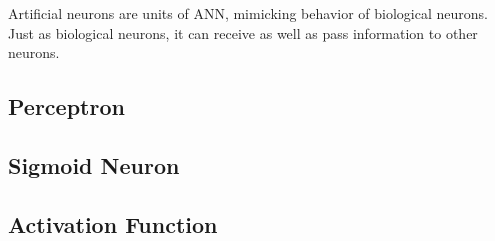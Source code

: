 Artificial neurons are units of ANN, mimicking behavior of biological neurons. Just as biological neurons, it can receive as well as pass information to other neurons.

\subsection{Perceptron}

\subsection{Sigmoid Neuron}

\subsection{Activation Function}

